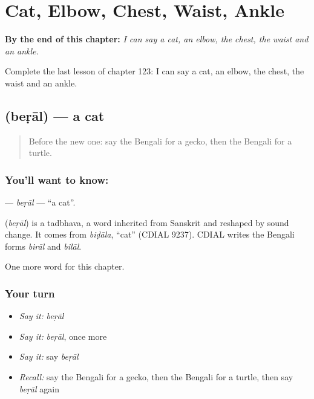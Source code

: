 
\chapter{Cat, Elbow, Chest, Waist, Ankle}
\label{ch:bn-cat-elbow-chest-waist-ankle}

\begin{chapteropening}
\textbf{By the end of this chapter:} \emph{I can say a cat, an elbow, the chest, the waist and an ankle.}

Complete the last lesson of chapter 123: I can say a cat, an elbow, the chest, the waist and an ankle.
\end{chapteropening}

\section[\texorpdfstring{\bn{বেড়াল} (beṛāl)}{বেড়াল (beṛāl)}]{ (beṛāl) — a cat}

\label{lesson:BN-C123-beral}



\begin{quote}
Before the new one: say the Bengali for a gecko, then the Bengali for a turtle.
\end{quote}

\subsection*{You'll want to know: }
\textbf{} — \emph{beṛāl} — \textquotedblleft{}a cat\textquotedblright{}.

\begin{cousinweb}
\textbf{} (\emph{beṛāl}) is a tadbhava, a word inherited from Sanskrit and reshaped by sound change. It comes from \emph{biḍāla}, \textquotedblleft{}cat\textquotedblright{} (CDIAL 9237). CDIAL writes the Bengali forms \emph{birāl} and \emph{bilāl}.
\end{cousinweb}

\begin{grammarlens}[title={What you've built}]
One more word for this chapter.
\end{grammarlens}

\subsection*{Your turn}
\begin{itemize}
\raggedright
  \item \emph{Say it:} \emph{beṛāl}
  \item \emph{Say it:} \emph{beṛāl}, once more
  \item \emph{Say it:} say \emph{beṛāl}
  \item \emph{Recall:} say the Bengali for a gecko, then the Bengali for a turtle, then say \emph{beṛāl} again
\end{itemize}


